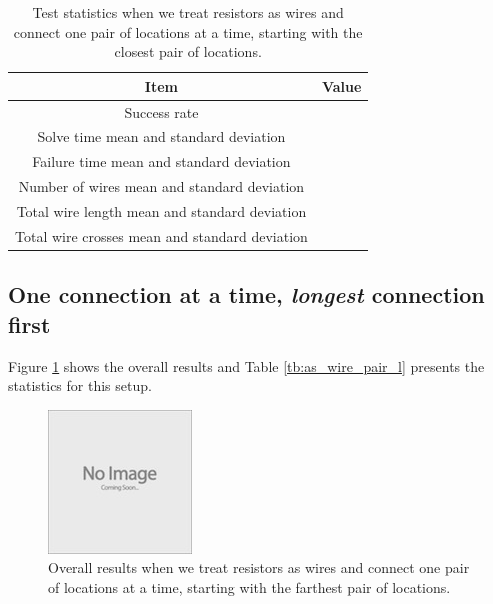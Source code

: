 \begin{table}[H]
\begin{center}
\begin{singlespace}
\begin{tabular}{| c | c |}
\hline
Item & Value \\
\hline\hline
Success rate & \\
Solve time mean and standard deviation & \\
Failure time mean and standard deviation & \\
Number of wires mean and standard deviation & \\
Total wire length mean and standard deviation & \\
Total wire crosses mean and standard deviation & \\
\hline
\end{tabular}
\end{singlespace}
\end{center}
\label{tb:as_wire_pair_s}
\caption{Test statistics when we treat resistors as wires and connect one
pair of locations at a time, starting with the closest pair of locations.}
\end{table}

\subsection{One connection at a time, \textit{longest} connection first}

Figure \ref{fig:as_wire_pair_l} shows the overall
results and Table \ref{tb:as_wire_pair_l} presents the statistics for this
setup.

\begin{figure}[H]
\begin{center}
\includegraphics{Images/placeholder.jpg}
\caption{Overall results when we treat resistors as wires and connect one
pair of locations at a time, starting with the farthest pair of locations.}
\label{fig:as_wire_pair_l}
\end{center}
\end{figure}

